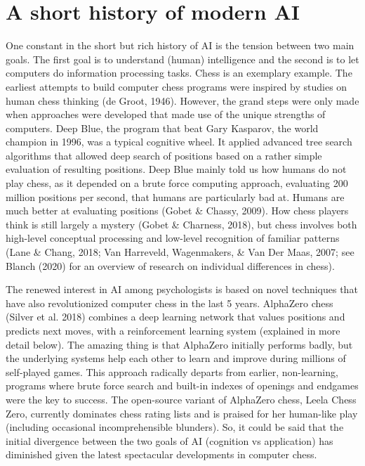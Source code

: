\section{A short history of modern AI}

One constant in the short but rich history of AI is the tension between
two main goals.
The first goal is to understand (human) intelligence and the second is
to let computers do information processing tasks.
Chess is an exemplary example.
The earliest attempts to build computer chess programs were inspired
by studies on human chess thinking (de Groot, 1946).
However, the grand steps were only made when approaches were developed
that made use of the unique strengths of computers.
Deep Blue, the program that beat Gary Kasparov, the world champion in
1996, was a typical cognitive wheel.
It applied advanced tree search algorithms that allowed deep search
of positions based on a rather simple evaluation of resulting positions.
Deep Blue mainly told us how humans do not play chess, as it depended
on a brute force computing approach, evaluating 200 million positions
per second, that humans are particularly bad at.
Humans are much better at evaluating positions (Gobet \& Chassy, 2009).
How chess players think is still largely a mystery
(Gobet \& Charness, 2018), but chess involves both high-level conceptual
processing and low-level recognition of familiar patterns
(Lane \& Chang, 2018; Van Harreveld, Wagenmakers, \& Van Der Maas, 2007;
see Blanch (2020) for an overview of research on individual differences
in chess).

The renewed interest in AI among psychologists is based on novel
techniques that have also revolutionized computer chess in the last
5 years.
AlphaZero chess (Silver et al. 2018) combines a deep learning network
that values positions and predicts next moves, with a reinforcement
learning system (explained in more detail below).
The amazing thing is that AlphaZero initially performs badly, but the
underlying systems help each other to learn and improve during millions
of self-played games.
This approach radically departs from earlier, non-learning, programs
where brute force search and built-in indexes of openings and endgames
were the key to success.
The open-source variant of AlphaZero chess, Leela Chess Zero, currently
dominates chess rating lists and is praised for her human-like play
(including occasional incomprehensible blunders).
So, it could be said that the initial divergence between the two goals
of AI (cognition vs application) has diminished given the latest
spectacular developments in computer chess.

